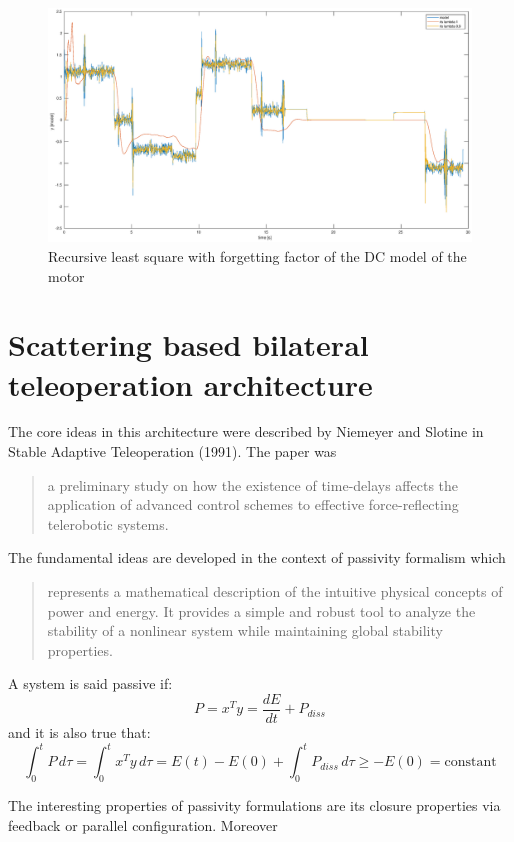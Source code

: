 \documentclass[a4paper,12pt]{article}
\begin{document}
\begin{figure}[H]
    \begin{center}
        \includegraphics[scale=0.3]{images/rls_forget.eps}
    \end{center}
    \caption{Recursive least square with forgetting factor of the DC model of the motor}
    \label{fig:rls_f}
\end{figure}

\section{Scattering based bilateral teleoperation architecture}
The core ideas in this architecture were described by Niemeyer and Slotine in Stable Adaptive Teleoperation (1991). The paper was \begin{quote}
    a preliminary study on how the existence of time-delays affects the application of advanced control schemes to effective force-reflecting telerobotic systems.
\end{quote}

The fundamental ideas are developed in the context of passivity formalism which
\begin{quote}
    represents a mathematical description of the intuitive physical concepts of power and energy. It provides a simple and robust tool to analyze the stability of a nonlinear system while maintaining global stability properties.
\end{quote}
A system is said passive if:
\[
    P = x^Ty = \frac{dE}{dt} + P_{diss}
\]
and it is also true that:
\[
    \int_{0}^{t} P \,d\tau = \int_{0}^{t} x^Ty \,d\tau = E(t) - E(0) + \int_{0}^{t} P_{diss} \,d\tau \geq -E(0) = \text{constant}
\]

\noindent The interesting properties of passivity formulations are its closure properties via feedback or parallel configuration. Moreover 
\end{document}
